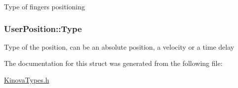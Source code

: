 Type of fingers positioning \hypertarget{struct_user_position_a93c748d4ee51239fcbcd487d88e52ffa}{
\subsubsection[{Type}]{ User\-Position\-::\-Type}}\label{struct_user_position_a93c748d4ee51239fcbcd487d88e52ffa}
Type of the position, can be an absolute position, a velocity or a time delay 

The documentation for this struct was generated from the following file\-:\begin{DoxyCompactItemize}
\item 
\hyperlink{_kinova_types_8h}{Kinova\-Types.\-h}\end{DoxyCompactItemize}
